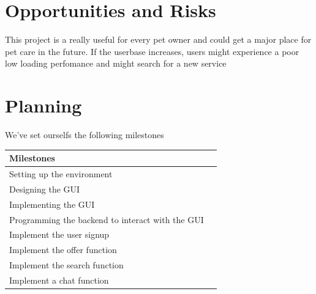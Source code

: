 \documentclass[12pt]{article}
\theoremstyle{definition}
\newenvironment{explanation}{%
}{}
\begin{document}
\section{Opportunities and Risks}
\begin{explanation}
This project is a really useful for every pet owner and could get a major place for pet care in the future.
\newline
If the userbase increases, users might experience a poor low loading perfomance and might search for a new service

\end{explanation}
\section{Planning}
\begin{explanation}
We've set ourselfs the following milestones
\begin{flushleft}
\begin{tabular}{|l|l|} \hline
Milestones \\ \hline
Setting up the environment \\ \hline
Designing the GUI \\ \hline
Implementing the GUI \\ \hline
Programming the backend to interact with the GUI \\ \hline
Implement the user signup \\ \hline
Implement the offer function \\ \hline
Implement the search function \\ \hline
Implement a chat function \\ \hline
\end{tabular}
\end{flushleft}
\end{explanation}
\end{document}
